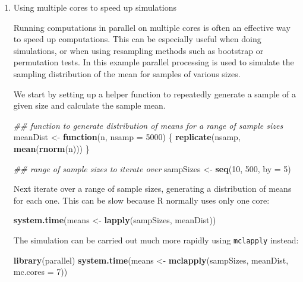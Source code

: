 \documentclass[
]{book}
\newenvironment{Shaded}{\begin{snugshade}}{\end{snugshade}}
\newcommand{\CommentTok}[1]{\textcolor[rgb]{0.56,0.35,0.01}{\textit{#1}}}
\newcommand{\ControlFlowTok}[1]{\textcolor[rgb]{0.13,0.29,0.53}{\textbf{#1}}}
\newcommand{\DataTypeTok}[1]{\textcolor[rgb]{0.13,0.29,0.53}{#1}}
\newcommand{\DecValTok}[1]{\textcolor[rgb]{0.00,0.00,0.81}{#1}}
\newcommand{\KeywordTok}[1]{\textcolor[rgb]{0.13,0.29,0.53}{\textbf{#1}}}
\newcommand{\NormalTok}[1]{#1}
\newcommand{\StringTok}[1]{\textcolor[rgb]{0.31,0.60,0.02}{#1}}
\begin{document}
\begin{enumerate}
\def\labelenumi{\arabic{enumi}.}
\item
  Using multiple cores to speed up simulations

  Running computations in parallel on multiple cores is often an
  effective way to speed up computations. This can be especially
  useful when doing simulations, or when using resampling methods such
  as bootstrap or permutation tests. In this example parallel
  processing is used to simulate the sampling distribution of the mean
  for samples of various sizes.

  We start by setting up a helper function to repeatedly generate a
  sample of a given size and calculate the sample mean.

\begin{Shaded}
\begin{Highlighting}[]
\CommentTok{\#\# function to generate distribution of means for a range of sample sizes}
\NormalTok{meanDist \textless{}{-}}\StringTok{ }\ControlFlowTok{function}\NormalTok{(n, }\DataTypeTok{nsamp =} \DecValTok{5000}\NormalTok{) \{}
  \KeywordTok{replicate}\NormalTok{(nsamp, }\KeywordTok{mean}\NormalTok{(}\KeywordTok{rnorm}\NormalTok{(n)))}
\NormalTok{\}}

\CommentTok{\#\# range of sample sizes to iterate over}
\NormalTok{sampSizes \textless{}{-}}\StringTok{ }\KeywordTok{seq}\NormalTok{(}\DecValTok{10}\NormalTok{, }\DecValTok{500}\NormalTok{, }\DataTypeTok{by =} \DecValTok{5}\NormalTok{)}
\end{Highlighting}
\end{Shaded}

  Next iterate over a range of sample sizes, generating a distribution
  of means for each one. This can be slow because R normally uses only
  one core:

\begin{Shaded}
\begin{Highlighting}[]
\KeywordTok{system.time}\NormalTok{(means \textless{}{-}}\StringTok{ }\KeywordTok{lapply}\NormalTok{(sampSizes, meanDist))}
\end{Highlighting}
\end{Shaded}

  The simulation can be carried out much more rapidly using \texttt{mclapply}
  instead:

\begin{Shaded}
\begin{Highlighting}[]
\KeywordTok{library}\NormalTok{(parallel)}
\KeywordTok{system.time}\NormalTok{(means \textless{}{-}}\StringTok{ }\KeywordTok{mclapply}\NormalTok{(sampSizes, meanDist, }\DataTypeTok{mc.cores =} \DecValTok{7}\NormalTok{))}
\end{Highlighting}
\end{Shaded}


\end{enumerate}
\end{document}
